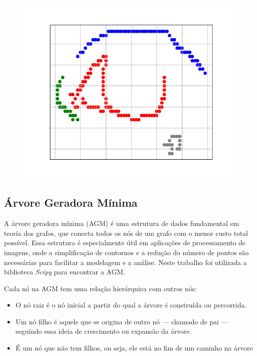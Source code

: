 \begin{figure}[h!]
    \vspace{1cm}

    \begin{minipage}[b]{0.45\textwidth}
        \centering
        \includegraphics[width=1\linewidth]{fig/04_connected_components_right_eye.png}
        \label{fig:grafos-olho}
    \end{minipage}
    \label{fig:resultado-grafo}
\end{figure}

\subsection{Árvore Geradora Mínima}
\label{sec:arvore-geradora-minima}

A árvore geradora mínima (AGM) é uma estrutura de dados fundamental em teoria dos grafos, que conecta todos os nós de um grafo com o menor custo total possível. Essa estrutura é especialmente útil em aplicações de processamento de imagens, onde a simplificação de contornos e a redução do número de pontos são necessárias para facilitar a modelagem e a análise. Neste trabalho foi utilizada a biblioteca \textit{Scipy} \cite{Scipy} para encontrar a AGM.

Cada nó na AGM tem uma relação hierárquica com outros nós:

\begin{itemize}
    \item O nó raiz é o nó inicial a partir do qual a árvore é construída ou percorrida.
    \item Um nó filho é aquele que se origina de outro nó — chamado de pai — seguindo essa ideia de crescimento ou expansão da árvore.
    \item É um nó que não tem filhos, ou seja, ele está no fim de um caminho na árvore
\end{itemize}



